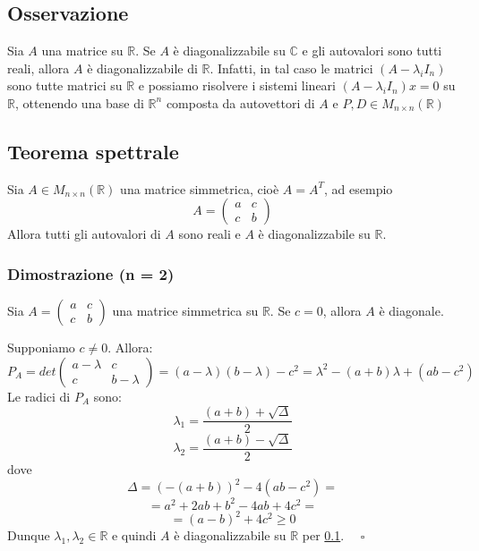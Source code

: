\documentclass[a4paper]{article}
\theoremstyle{break}
\theoremstyle{break}
\theoremstyle{break}
\theoremstyle{break}
\begin{document}
\subsection{Osservazione}
\label{10.8}
Sia \( A \) una matrice su \( \mathbb{R} \). Se \( A \) è diagonalizzabile su \( \mathbb{C} \) 
e gli autovalori sono tutti reali, allora \( A \) è diagonalizzabile di \( \mathbb{R} \).
Infatti, in tal caso le matrici \( (A - \lambda_i I_n) \) sono tutte matrici su
\( \mathbb{R} \) e possiamo risolvere i sistemi lineari \( (A - \lambda_i I_n)x = 0 \) su
\( \mathbb{R} \), ottenendo una base di \( \mathbb{R}^n \) composta da autovettori di \( A \)
e \( P,D \in M_{n \times n}(\mathbb{R}) \) 

\subsection{Teorema spettrale}
Sia \( A \in M_{n \times n}(\mathbb{R}) \) una matrice simmetrica, cioè \( A = A^T \),
ad esempio
\[
A = \begin{pmatrix} 
  a & c\\
  c & b
\end{pmatrix} 
\] 
Allora tutti gli autovalori di \( A \) sono reali e \( A \) è diagonalizzabile su
\( \mathbb{R} \).

\subsubsection{Dimostrazione (n = 2)}
Sia \( A = \begin{pmatrix} a & c\\ c & b \end{pmatrix}  \) una matrice simmetrica su \( \mathbb{R} \).
Se \( c = 0 \), allora \( A \) è diagonale.

\noindent Supponiamo \( c \neq 0 \). Allora:
\[
P_A = det \begin{pmatrix} 
  a - \lambda & c\\
  c & b - \lambda
\end{pmatrix} 
= (a - \lambda)(b - \lambda) - c^2 = \lambda^2 - (a + b) \lambda + (ab - c^2)
\] 
Le radici di \( P_A \) sono:
\[
\lambda_1 = \frac{(a+b)+\sqrt{\Delta}}{2}
\] 
\[
\lambda_2 = \frac{(a+b)-\sqrt{\Delta}}{2}
\] 
dove
\[
\Delta = (-(a+b))^2 - 4(ab-c^2) =
\] 
\[
= a^2 + 2ab + b^2 - 4ab + 4c^2 =
\] 
\[
= (a-b)^2 + 4c^2 \ge 0
\] 
Dunque \( \lambda_1, \lambda_2 \in \mathbb{R} \) e quindi \( A \) è diagonalizzabile
su \( \mathbb{R} \) per \ref{10.8}. \( \quad \square \) 
\end{document}
